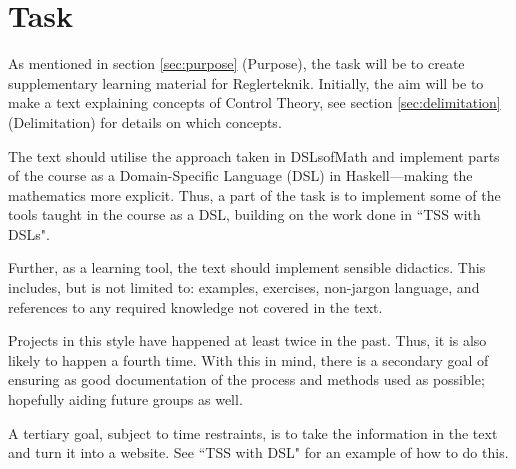 \section{Task}
As mentioned in section \ref{sec:purpose} (Purpose), the task will be to create supplementary learning material for Reglerteknik\cite{ERE103}. 
Initially, the aim will be to make a text explaining concepts of Control Theory, see section \ref{sec:delimitation} (Delimitation) for details on which concepts. 

The text should utilise the approach taken in DSLsofMath\cite{DAT326} and implement parts of the course as a Domain-Specific Language (DSL) in Haskell---making the mathematics more explicit. Thus, a part of the task is to implement some of the tools taught in the course as a DSL, building on the work done in ``TSS with DSLs"\cite{tssarbete}.

Further, as a learning tool, the text should implement sensible didactics. This includes, but is not limited to: examples, exercises, non-jargon language, and references to any required knowledge not covered in the text.

Projects in this style have happened at least twice in the past\cite{tssarbete}\cite{fysikarbete}. Thus, it is also likely to happen a fourth time. With this in mind, there is a secondary goal of ensuring as good documentation of the process and methods used as possible; hopefully aiding future groups as well.

A tertiary goal, subject to time restraints, is to take the information in the text and turn it into a website. See ``TSS with DSL"\cite{tssarbete} for an example of how to do this. 





\iffalse
The main problem of the project is to develop a supplementary learning material for courses in control theory. This problem can be divided into three sub-parts.

\begin{enumerate}

\item Understand control theory as a subject and the courses available at Chalmers on the subject. We need to understand what knowledge students lack and what parts of the courses most students struggle with.


\item Learn more about Haskell and how to use it in order to design domain-specific languages in large, and to design data structures and functions to represent our domain-specific language.


\item Learn about the didactic methods used to develop learning material. We need to find a way to describe the domain specific language to students with little understanding about control theory.
\end{enumerate}
\fi






